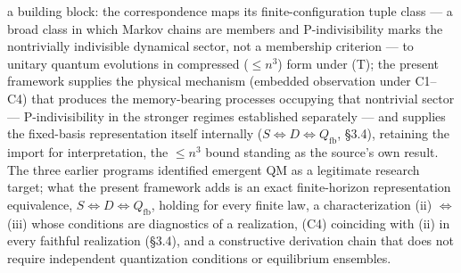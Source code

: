 \documentclass[
]{article}
\begin{document}
a building block: the correspondence maps its finite-configuration tuple
class --- a broad class in which Markov chains are members and
P-indivisibility marks the nontrivially indivisible dynamical sector,
not a membership criterion --- to unitary quantum evolutions in
compressed (\(\leq n^3\)) form under (T); the present framework supplies
the physical mechanism (embedded observation under C1--C4) that produces
the memory-bearing processes occupying that nontrivial sector ---
P-indivisibility in the stronger regimes established separately --- and
supplies the fixed-basis representation itself internally
(\(S \iff D \iff Q_{\mathrm{fb}}\), §3.4), retaining the import for
interpretation, the \(\leq n^3\) bound standing as the source's own
result. The three earlier programs identified emergent QM as a
legitimate research target; what the present framework adds is an exact
finite-horizon representation equivalence,
\(S \iff D \iff Q_{\mathrm{fb}}\), holding for every finite law, a
characterization (ii) \(\iff\) (iii) whose conditions are diagnostics of
a realization, (C4) coinciding with (ii) in every faithful realization
(§3.4), and a constructive derivation chain that does not require
independent quantization conditions or equilibrium ensembles.
\end{document}
